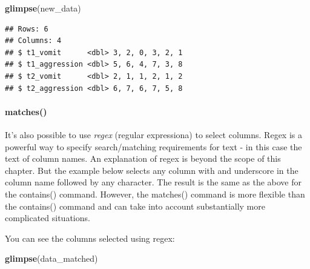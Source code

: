 \documentclass[
]{krantz}
\makeatletter
\newenvironment{Shaded}{\begin{snugshade}}{\end{snugshade}}
\newcommand{\KeywordTok}[1]{\textcolor[rgb]{0.27,0.27,0.27}{\textbf{#1}}}
\newcommand{\NormalTok}[1]{#1}
\newcommand{\OperatorTok}[1]{\textcolor[rgb]{0.43,0.43,0.43}{\textbf{#1}}}
\newcommand{\StringTok}[1]{\textcolor[rgb]{0.5,0.5,0.5}{#1}}
\newenvironment{kframe}{%
\medskip{}
\setlength{\fboxsep}{.8em}
 \def\at@end@of@kframe{}%
 \ifinner\ifhmode%
  \def\at@end@of@kframe{\end{minipage}}%
  \begin{minipage}{\columnwidth}%
 \fi\fi%
 \def\FrameCommand##1{\hskip\@totalleftmargin \hskip-\fboxsep
 \colorbox{shadecolor}{##1}\hskip-\fboxsep
     \hskip-\linewidth \hskip-\@totalleftmargin \hskip\columnwidth}%
 \MakeFramed {\advance\hsize-\width
   \@totalleftmargin\z@ \linewidth\hsize
   \@setminipage}}%
 {\par\unskip\endMakeFramed%
 \at@end@of@kframe}
\renewenvironment{Shaded}{\begin{kframe}}{\end{kframe}}
\makeatother
\begin{document}
\begin{Shaded}
\end{Shaded}

\begin{Shaded}
\begin{Highlighting}[]
\KeywordTok{glimpse}\NormalTok{(new_data)}
\end{Highlighting}
\end{Shaded}

\begin{verbatim}
## Rows: 6
## Columns: 4
## $ t1_vomit      <dbl> 3, 2, 0, 3, 2, 1
## $ t1_aggression <dbl> 5, 6, 4, 7, 3, 8
## $ t2_vomit      <dbl> 2, 1, 1, 2, 1, 2
## $ t2_aggression <dbl> 6, 7, 6, 7, 5, 8
\end{verbatim}

\hypertarget{matches}{%
\paragraph{matches()}\label{matches}}

It's also possible to use \emph{regex} (regular expressiona) to select columns. Regex is a powerful way to specify search/matching requirements for text - in this case the text of column names. An explanation of regex is beyond the scope of this chapter. But the example below selects any column with and underscore in the column name followed by any character. The result is the same as the above for the contains() command. However, the matches() command is more flexible than the contains() command and can take into account substantially more complicated situations.

\begin{Shaded}
\end{Shaded}

You can see the columns selected using regex:

\begin{Shaded}
\begin{Highlighting}[]
\KeywordTok{glimpse}\NormalTok{(data_matched)}
\end{Highlighting}
\end{Shaded}
\end{document}
